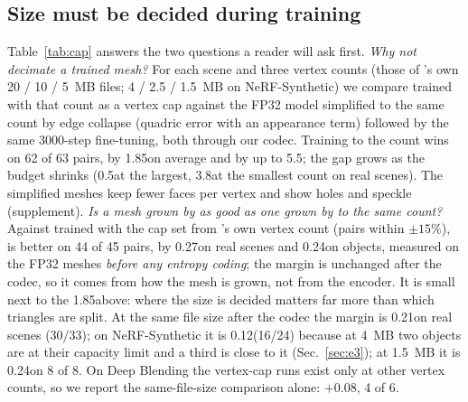 \subsection{Size must be decided during training}
\label{sec:e1}
Table~\ref{tab:cap} answers the two questions a reader will ask first. \emph{Why not decimate a trained mesh?} For each scene and three vertex counts (those of \BM's own 20 / 10 / 5~MB files; 4 / 2.5 / 1.5~MB on NeRF-Synthetic) we compare \MS trained with that count as a vertex cap against the FP32 model simplified to the same count by edge collapse (quadric error with an appearance term) followed by the same 3000-step fine-tuning, both through our codec. Training to the count wins on 62 of 63 pairs, by 1.85\dB on average and by up to 5.5\dB; the gap grows as the budget shrinks (0.5\dB at the largest, 3.8\dB at the smallest count on real scenes). The simplified meshes keep fewer faces per vertex and show holes and speckle (supplement). \emph{Is a mesh grown by \BM as good as one grown by \MS to the same count?} Against \MS trained with the cap set from \BM's own vertex count (pairs within $\pm15\%$), \BM is better on 44 of 45 pairs, by 0.27\dB on real scenes and 0.24\dB on objects, measured on the FP32 meshes \emph{before any entropy coding}; the margin is unchanged after the codec, so it comes from how the mesh is grown, not from the encoder. It is small next to the 1.85\dB above: where the size is decided matters far more than which triangles are split. At the same file size after the codec the margin is 0.21\dB on real scenes (30/33); on NeRF-Synthetic it is 0.12\dB (16/24) because at 4~MB two objects are at their capacity limit and a third is close to it (Sec.~\ref{sec:e3}); at 1.5~MB it is 0.24\dB on 8 of 8. On Deep Blending the vertex-cap runs exist only at other vertex counts, so we report the same-file-size comparison alone: $+0.08$\dB, 4 of 6.

